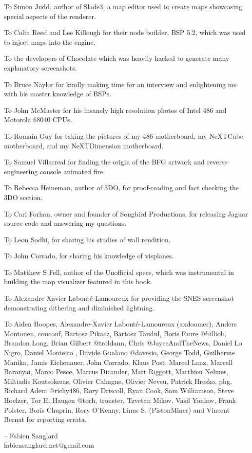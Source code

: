 \par
To Simon Judd, author of Slade3, a map editor used to create maps showcasing special aspects of the renderer.\\
\par
To Colin Reed and Lee Killough for their node builder, BSP 5.2, which was used to inject maps into the \doom{} engine.\\
\par
To the developers of Chocolate \doom{} which was heavily hacked to generate many explanatory screenshots.\\
\par
To Bruce Naylor for kindly making time for an interview and enlightening me with his master knowledge of BSPs.\\
\par
To John McMaster for his insanely high resolution photos of Intel 486 and Motorola 68040 CPUs.\\
\par
To Romain Guy for taking the pictures of my 486 motherboard, my NeXTCube motherboard, and my NeXTDimension motherboard.\\
\par
To Samuel Villarreal for finding the origin of the BFG artwork and reverse engineering \doom{} console animated fire.\\
\par
To Rebecca Heineman, author of \doom{} 3DO, for proof-reading and fact checking the 3DO section.\\
\par
To Carl Forhan, owner and founder of Songbird Productions, for releasing \doom{} Jaguar source code and answering my questions.\\
\par
To Leon Sodhi, for sharing his studies of \doom{} wall rendition.\\
\par
To John Corrado, for sharing his knowledge of visplanes.\\
\par
To Matthew S Fell, author of the Unofficial \doom{} specs, which was instrumental in building the map visualizer featured in this book.\\
\par
To Alexandre-Xavier Labont\'{e}-Lamoureux for providing the SNES screenshot demonstrating dithering and diminished lightning.\\
\par
To Aiden Hoopes, Alexandre-Xavier Labont\'{e}-Lamoureux (axdoomer), Anders Montonen, coucouf, Bartosz Pikacz, Bartosz Taudul, Boris Faure @billiob, Brandon Long, Brian Gilbert @troldann, Chris @JayceAndTheNews, Daniel Lo Nigro, Daniel Monteiro , Davide Gualano @davesio, George Todd, Guilherme Manika, Jamis Eichenauer, John Corrado, Klaus Post, Marcel Lanz, Marcell Baranyai, Marco Pesce, Marcus Dicander, Matt Riggott, Matthieu Nelmes, Miltiadis Koutsokeras, Olivier Cahagne, Olivier Neveu, Patrick Hresko, phg, Richard Adem @richy486, Rory Driscoll, Ryan Cook, Sam Williamson, Steve Hoelzer, Tor H. Haugen @torh, tronster, Tzvetan Mikov, Vasil Yonkov, Frank Polster, Boris Chuprin, Rory O'Kenny, Linus S. (PistonMiner) and Vincent Bernat for reporting errata.\\
\par
-- Fabien Sanglard\\
fabiensanglard.net@gmail.com
